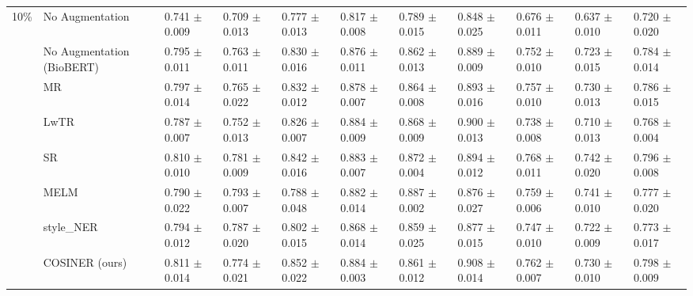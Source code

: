 \begin{table}
{{\begin{tabular}{cllll|lll|lll}
\midrule
\multirow{8}{*}{10\%} & No Augmentation & 0.741 $\pm$ 0.009 & 0.709 $\pm$ 0.013 & 0.777 $\pm$ 0.013 & 0.817 $\pm$ 0.008 & 0.789 $\pm$ 0.015 & 0.848 $\pm$ 0.025 & 0.676 $\pm$ 0.011 & 0.637 $\pm$ 0.010 & 0.720 $\pm$ 0.020 \\
&No Augmentation (BioBERT) & 0.795 $\pm$ 0.011 & 0.763 $\pm$ 0.011 & 0.830 $\pm$ 0.016 & 0.876 $\pm$ 0.011 & 0.862 $\pm$ 0.013 & 0.889 $\pm$ 0.009 & 0.752 $\pm$ 0.010 & 0.723 $\pm$ 0.015 & 0.784 $\pm$ 0.014 \\
&MR & 0.797 $\pm$ 0.014 & 0.765 $\pm$ 0.022 & 0.832 $\pm$ 0.012 & 0.878 $\pm$ 0.007 & 0.864 $\pm$ 0.008 & 0.893 $\pm$ 0.016 & 0.757 $\pm$ 0.010 & 0.730 $\pm$ 0.013 & 0.786 $\pm$ 0.015 \\
&LwTR & 0.787 $\pm$ 0.007 & 0.752 $\pm$ 0.013 & 0.826 $\pm$ 0.007 & 0.884 $\pm$ 0.009 & 0.868 $\pm$ 0.009 & 0.900 $\pm$ 0.013 & 0.738 $\pm$ 0.008 & 0.710 $\pm$ 0.013 & 0.768 $\pm$ 0.004 \\
&SR & 0.810 $\pm$ 0.010 & 0.781 $\pm$ 0.009 & 0.842 $\pm$ 0.016 & 0.883 $\pm$ 0.007 & 0.872 $\pm$ 0.004 & 0.894 $\pm$ 0.012 & 0.768 $\pm$ 0.011 & 0.742 $\pm$ 0.020 & 0.796 $\pm$ 0.008 \\
&MELM & 0.790 $\pm$ 0.022 & 0.793 $\pm$ 0.007 & 0.788 $\pm$ 0.048 & 0.882 $\pm$ 0.014 & 0.887 $\pm$ 0.002 & 0.876 $\pm$ 0.027 & 0.759 $\pm$ 0.006 & 0.741 $\pm$ 0.010 & 0.777 $\pm$ 0.020 \\
&style\_NER & 0.794 $\pm$ 0.012 & 0.787 $\pm$ 0.020 & 0.802 $\pm$ 0.015 & 0.868 $\pm$ 0.014 & 0.859 $\pm$ 0.025 & 0.877 $\pm$ 0.015 & 0.747 $\pm$ 0.010 & 0.722 $\pm$ 0.009 & 0.773 $\pm$ 0.017 \\
&COSINER (ours) & 0.811 $\pm$ 0.014 & 0.774 $\pm$ 0.021 & 0.852 $\pm$ 0.022 & 0.884 $\pm$ 0.003 & 0.861 $\pm$ 0.012 & 0.908 $\pm$ 0.014 & 0.762 $\pm$ 0.007 & 0.730 $\pm$ 0.010 & 0.798 $\pm$ 0.009 \\\bottomrule
        \end{tabular}}}
        \label{tab:baselines_comp}
        \end{table}
